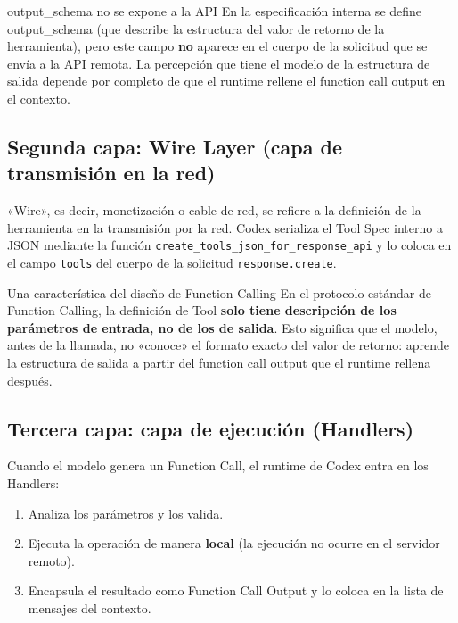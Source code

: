 \documentclass[a4paper]{article}
\begin{document}
\begin{warningbox}{output\_schema no se expone a la API}
En la especificación interna se define output\_schema (que describe la estructura del valor de retorno de la herramienta), pero este campo \textbf{no} aparece en el cuerpo de la solicitud que se envía a la API remota. La percepción que tiene el modelo de la estructura de salida depende por completo de que el runtime rellene el function call output en el contexto.
\end{warningbox}

\subsection{Segunda capa: Wire Layer (capa de transmisión en la red)}

«Wire», es decir, monetización o cable de red, se refiere a la definición de la herramienta en la transmisión por la red. Codex serializa el Tool Spec interno a JSON mediante la función \texttt{create\_tools\_json\_for\_response\_api} y lo coloca en el campo \texttt{tools} del cuerpo de la solicitud \texttt{response.create}.

\begin{knowledgebox}{Una característica del diseño de Function Calling}
En el protocolo estándar de Function Calling, la definición de Tool \textbf{solo tiene descripción de los parámetros de entrada, no de los de salida}. Esto significa que el modelo, antes de la llamada, no «conoce» el formato exacto del valor de retorno: aprende la estructura de salida a partir del function call output que el runtime rellena después.
\end{knowledgebox}

\subsection{Tercera capa: capa de ejecución (Handlers)}

Cuando el modelo genera un Function Call, el runtime de Codex entra en los Handlers:
\begin{enumerate}
    \item Analiza los parámetros y los valida.
    \item Ejecuta la operación de manera \textbf{local} (la ejecución no ocurre en el servidor remoto).
    \item Encapsula el resultado como Function Call Output y lo coloca en la lista de mensajes del contexto.
\end{enumerate}
\end{document}
